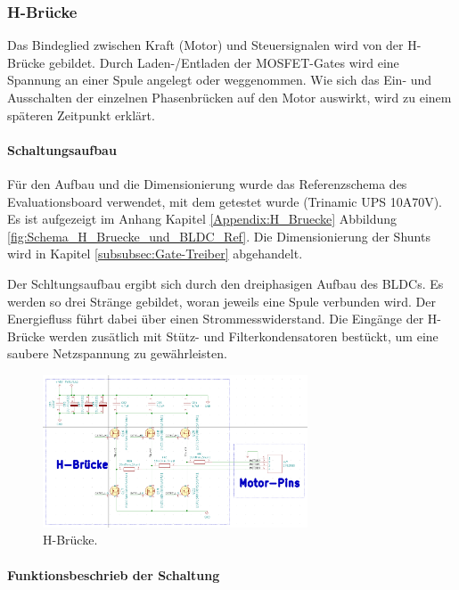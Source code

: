 \subsubsection{H-Brücke}
\label{subsubsec:H-Brücke}

Das Bindeglied zwischen Kraft (Motor) und Steuersignalen wird von der H-Brücke gebildet. Durch Laden-/Entladen der MOSFET-Gates wird eine Spannung an einer Spule angelegt oder weggenommen. Wie sich das Ein- und Ausschalten der einzelnen Phasenbrücken auf den Motor auswirkt, wird zu einem späteren Zeitpunkt erklärt.

\paragraph{Schaltungsaufbau}\mbox{}

Für den Aufbau und die Dimensionierung wurde das Referenzschema des Evaluationsboard verwendet, mit dem getestet wurde (Trinamic UPS 10A70V). Es ist aufgezeigt im Anhang Kapitel \ref{Appendix:H_Bruecke} Abbildung \ref{fig:Schema_H_Bruecke_und_BLDC_Ref}. Die Dimensionierung der Shunts wird in Kapitel \ref{subsubsec:Gate-Treiber} abgehandelt.

Der Schltungsaufbau ergibt sich durch den dreiphasigen Aufbau des BLDCs. Es werden so drei Stränge gebildet, woran jeweils eine Spule verbunden wird. Der Energiefluss führt dabei über einen Strommesswiderstand. Die Eingänge der H-Brücke werden zusätlich mit Stütz- und Filterkondensatoren bestückt, um eine saubere Netzspannung zu gewährleisten.

\begin{figure}[h!]
	\centering
	\includegraphics[width=0.7\textwidth]{graphics/Schema_H_Bruecke_und_BLDC}
	\caption{H-Brücke.}
	\label{fig:Schema_H_Bruecke_und_BLDC}
\end{figure}

\paragraph{Funktionsbeschrieb der Schaltung}\mbox{}

